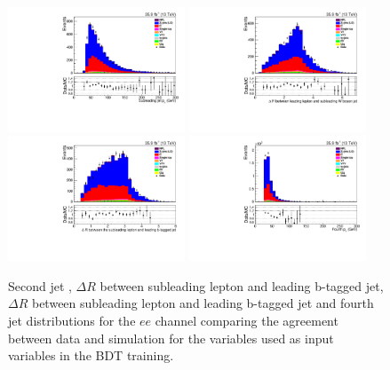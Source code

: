 \begin{figure}[htb]
\centering
\includegraphics[width=0.47\textwidth]{figs/background-estimation/plots/unblinded/prompt_ee_ttbarInc/secondJetPt_NPL_ee_wMass_ee.pdf}
\includegraphics[width=0.47\textwidth]{figs/background-estimation/plots/unblinded/prompt_ee_ttbarInc/zLep1Quark2DelR_NPL_ee_wMass_ee.pdf}
\\
\includegraphics[width=0.47\textwidth]{figs/background-estimation/plots/unblinded/prompt_ee_ttbarInc/zLep2BjetDelR_NPL_ee_wMass_ee.pdf}
\includegraphics[width=0.47\textwidth]{figs/background-estimation/plots/unblinded/prompt_ee_ttbarInc/fourthJetPt_NPL_ee_wMass_ee.pdf}
\caption{
Second jet \pt, $\Delta R$ between subleading lepton and leading b-tagged jet, $\Delta R$ between subleading lepton and leading b-tagged jet and fourth jet \pT distributions for the $ee$ channel comparing the agreement between data and simulation for the variables used as input variables in the BDT training.}
\label{fig:appInputFeaturesDataSimAgreement3}
\end{figure}


